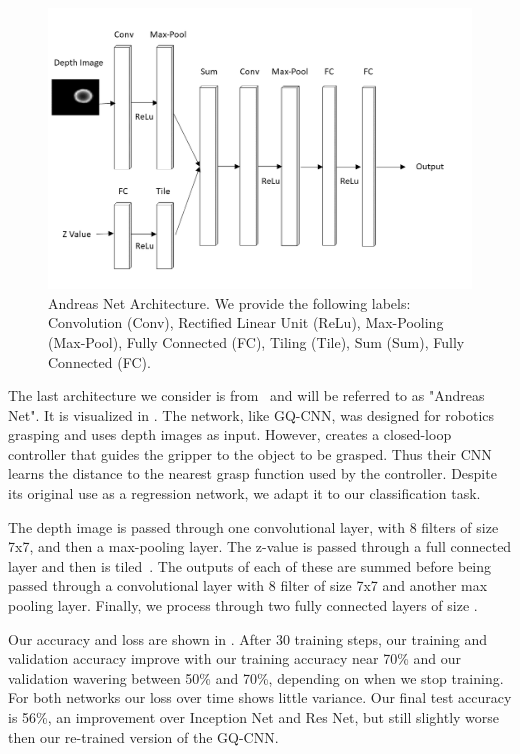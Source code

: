 \begin{figure}[t!]
    \includegraphics[width=0.99\columnwidth]{figs/andreas_net.png}
\caption{Andreas Net Architecture. We provide the following labels: Convolution (Conv), Rectified Linear Unit (ReLu), Max-Pooling (Max-Pool),  Fully Connected (FC), Tiling (Tile), Sum (Sum), Fully Connected (FC).} \label{fig:andreas_net}
\end{figure}

The last architecture we consider is from~\cite{viereck2017learning} and will be referred to as "Andreas Net". 
It is visualized in . 
The network, like GQ-CNN, was designed for robotics grasping and uses depth images as input. 
However, \cite{viereck2017learning} creates a closed-loop controller that guides the gripper to the object to be grasped. 
Thus their CNN learns the distance to the nearest grasp function used by the controller. 
Despite its original use as a regression network, we adapt it to our classification task. 

The depth image is passed through one convolutional layer, with 8 filters of size 7x7, and then a max-pooling layer. 
The z-value is passed through a full connected layer and then is tiled~\cite{ngiam2010tiled}.
 
The outputs of each of these are summed before being passed through a convolutional layer with 8 filter of size 7x7 and another max pooling layer. 
Finally, we process through two fully connected layers of size . 


Our accuracy and loss are shown in . 
After 30 training steps, our training and validation accuracy improve with our training accuracy near 70\% and our validation wavering between 50\% and 70\%, depending on when we stop training. 
For both networks our loss over time shows little variance. 
Our final test accuracy is 56\%, an improvement over Inception Net and Res Net, but still slightly worse then our re-trained version of the GQ-CNN. 

